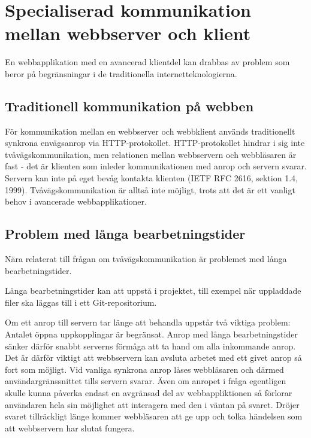 \section{Specialiserad kommunikation mellan webbserver och klient}

En webbapplikation med en avancerad klientdel kan drabbas av problem som beror på begränsningar i de traditionella internetteknologierna.

\subsection{Traditionell kommunikation på webben}

För kommunikation mellan en webbserver och webbklient används traditionellt synkrona envägsanrop via HTTP-protokollet. HTTP-protokollet hindrar i sig inte tvåvägskommunikation, men relationen mellan webbservern och webbläsaren är fast - det är klienten som inleder kommunikationen med anrop och servern svarar. Servern kan inte på eget bevåg kontakta klienten (IETF RFC 2616, sektion 1.4, 1999). Tvåvägskommunikation är alltså inte möjligt, trots att det är ett vanligt behov i avancerade webbapplikationer.

\subsection{Problem med långa bearbetningstider}

Nära relaterat till frågan om tvåvägskommunikation är problemet med långa bearbetningstider.

Långa bearbetningstider kan att uppstå i projektet, till exempel när uppladdade filer ska läggas till i ett Git-repositorium. 

Om ett anrop till servern tar länge att behandla uppstår två viktiga problem:
Antalet öppna uppkopplingar är begränsat. Anrop med långa bearbetningstider sänker därför snabbt serverns förmåga att ta hand om alla inkommande anrop. Det är därför viktigt att webbservern kan avsluta arbetet med ett givet anrop så fort som möjligt. 
Vid vanliga synkrona anrop låses webbläsaren och därmed användargränssnittet tills servern svarar. Även om anropet i fråga egentligen skulle kunna påverka endast en avgränsad del av webbappliktionen så  förlorar användaren hela sin möjlighet att interagera med den i väntan på svaret. Dröjer svaret tillräckligt länge kommer webbläsaren att ge upp och tolka händelsen som att webbservern har slutat fungera.

